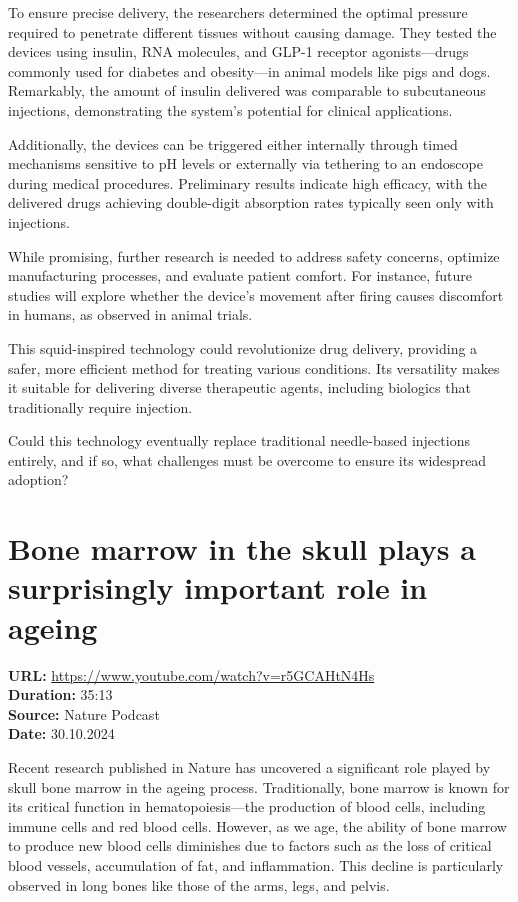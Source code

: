 \documentclass[12pt]{article}
\begin{document}
To ensure precise delivery, the researchers determined the optimal pressure required to penetrate different tissues without causing damage. They tested the devices using insulin, RNA molecules, and GLP-1 receptor agonists—drugs commonly used for diabetes and obesity—in animal models like pigs and dogs. Remarkably, the amount of insulin delivered was comparable to subcutaneous injections, demonstrating the system's potential for clinical applications.

Additionally, the devices can be triggered either internally through timed mechanisms sensitive to pH levels or externally via tethering to an endoscope during medical procedures. Preliminary results indicate high efficacy, with the delivered drugs achieving double-digit absorption rates typically seen only with injections.

While promising, further research is needed to address safety concerns, optimize manufacturing processes, and evaluate patient comfort. For instance, future studies will explore whether the device’s movement after firing causes discomfort in humans, as observed in animal trials.

This squid-inspired technology could revolutionize drug delivery, providing a safer, more efficient method for treating various conditions. Its versatility makes it suitable for delivering diverse therapeutic agents, including biologics that traditionally require injection.

\vspace{0.5cm}
Could this technology eventually replace traditional needle-based injections entirely, and if so, what challenges must be overcome to ensure its widespread adoption?

\newpage

\section{Bone marrow in the skull plays a surprisingly important role in ageing}
\textbf{URL:} \url{https://www.youtube.com/watch?v=r5GCAHtN4Hs}\\
\textbf{Duration:} 35:13\\
\textbf{Source:} Nature Podcast\\
\textbf{Date:} 30.10.2024



Recent research published in Nature has uncovered a significant role played by skull bone marrow in the ageing process. Traditionally, bone marrow is known for its critical function in hematopoiesis—the production of blood cells, including immune cells and red blood cells. However, as we age, the ability of bone marrow to produce new blood cells diminishes due to factors such as the loss of critical blood vessels, accumulation of fat, and inflammation. This decline is particularly observed in long bones like those of the arms, legs, and pelvis.
\end{document}
